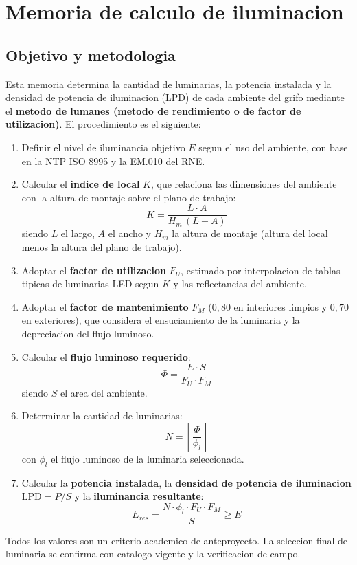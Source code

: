 ﻿\chapter{Memoria de calculo de iluminacion}
\label{chap:iluminacion}

\section{Objetivo y metodologia}
Esta memoria determina la cantidad de luminarias, la potencia instalada y la
densidad de potencia de iluminacion (LPD) de cada ambiente del grifo mediante
el \textbf{metodo de lumanes (metodo de rendimiento o de factor de
utilizacion)}. El procedimiento es el siguiente:

\begin{enumerate}
\item Definir el nivel de iluminancia objetivo \(E\) segun el uso del ambiente,
  con base en la NTP ISO 8995 y la EM.010 del RNE.
\item Calcular el \textbf{indice de local} \(K\), que relaciona las
  dimensiones del ambiente con la altura de montaje sobre el plano de trabajo:
  \[
    K = \frac{L \cdot A}{H_m\,(L + A)}
  \]
  siendo \(L\) el largo, \(A\) el ancho y \(H_m\) la altura de montaje
  (altura del local menos la altura del plano de trabajo).
\item Adoptar el \textbf{factor de utilizacion} \(F_U\), estimado por
  interpolacion de tablas tipicas de luminarias LED segun \(K\) y las
  reflectancias del ambiente.
\item Adoptar el \textbf{factor de mantenimiento} \(F_M\) (\(0,80\) en
  interiores limpios y \(0,70\) en exteriores), que considera el ensuciamiento
  de la luminaria y la depreciacion del flujo luminoso.
\item Calcular el \textbf{flujo luminoso requerido}:
  \[
    \Phi = \frac{E \cdot S}{F_U \cdot F_M}
  \]
  siendo \(S\) el area del ambiente.
\item Determinar la cantidad de luminarias:
  \[
    N = \left\lceil \frac{\Phi}{\phi_l} \right\rceil
  \]
  con \(\phi_l\) el flujo luminoso de la luminaria seleccionada.
\item Calcular la \textbf{potencia instalada}, la \textbf{densidad de potencia
  de iluminacion} \(\text{LPD} = P/S\) y la \textbf{iluminancia resultante}:
  \[
    E_{res} = \frac{N \cdot \phi_l \cdot F_U \cdot F_M}{S} \geq E
  \]
\end{enumerate}

Todos los valores son un criterio academico de anteproyecto. La seleccion
final de luminaria se confirma con catalogo vigente y la verificacion de campo.

